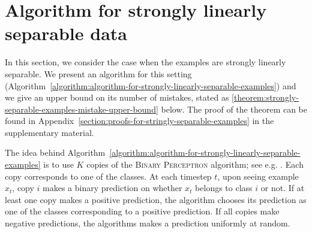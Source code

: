 \section{Algorithm for strongly linearly separable data}
\label{section:algorithm-for-strongly-linearly-separable-data}

In this section, we consider the case when the examples are strongly linearly
separable. We present an algorithm for this setting
(Algorithm~\ref{algorithm:algorithm-for-strongly-linearly-separable-examples})
and we give an upper bound on its number of mistakes, stated as
\autoref{theorem:strongly-separable-examples-mistake-upper-bound} below. The
proof of the theorem can be found in
Appendix~\ref{section:proofs-for-stringly-separable-examples} in the
supplementary material.

The idea behind
Algorithm~\ref{algorithm:algorithm-for-strongly-linearly-separable-examples} is
to use $K$ copies of the \textsc{Binary Perceptron} algorithm; see e.g.
\citet[Section 3.3.1]{Shalev-Shwartz-2012}. Each copy corresponds to one of the
classes. At each timestep $t$, upon seeing example $x_t$, copy $i$ makes a
binary prediction on whether $x_t$ belongs to class $i$ or not. If at least one
copy makes a positive prediction, the algorithm chooses its prediction as one of
the classes corresponding to a positive prediction. If all copies make negative
predictions, the algorithms makes a prediction uniformly at random.


